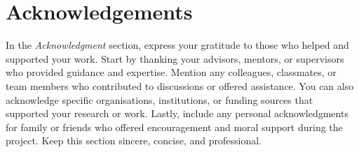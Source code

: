 \thispagestyle{plain} %

\chapter*{Acknowledgements} %


In the \textit{Acknowledgment} section, express your gratitude to those who helped and supported your work. Start by thanking your advisors, mentors, or supervisors who provided guidance and expertise. Mention any colleagues, classmates, or team members who contributed to discussions or offered assistance. You can also acknowledge specific organisations, institutions, or funding sources that supported your research or work. Lastly, include any personal acknowledgments for family or friends who offered encouragement and moral support during the project. Keep this section sincere, concise, and professional.

\plainblankpage